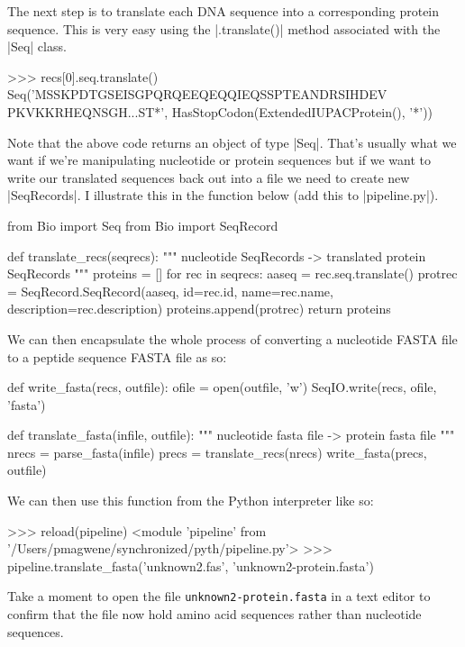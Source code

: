 The next step is to translate each  DNA sequence into a corresponding protein sequence. This is very easy using the |.translate()| method associated with the |Seq| class.

\begin{python}
>>> recs[0].seq.translate()
Seq('MSSKPDTGSEISGPQRQEEQEQQIEQSSPTEANDRSIHDEV
PKVKKRHEQNSGH...ST*', HasStopCodon(ExtendedIUPACProtein(), '*'))
\end{python}
%
Note that the above code returns an object of type |Seq|. That's usually what we want if we're manipulating nucleotide or protein sequences but if we want to write our translated sequences back out into a file we need to create new |SeqRecords|. I illustrate this in the function below (add this to |pipeline.py|).

\begin{python}
from Bio import Seq
from Bio import SeqRecord

def translate_recs(seqrecs):
    """ nucleotide SeqRecords -> translated protein SeqRecords """ 
    proteins = []
    for rec in seqrecs:
        aaseq = rec.seq.translate()
        protrec = SeqRecord.SeqRecord(aaseq, id=rec.id, name=rec.name, 
        			      description=rec.description)
        proteins.append(protrec)
    return proteins
\end{python}    

We can then encapsulate the whole process of converting a nucleotide FASTA file to a peptide sequence FASTA file as so:

\begin{python}
def write_fasta(recs, outfile):
    ofile = open(outfile, 'w')
    SeqIO.write(recs, ofile, 'fasta')

def translate_fasta(infile, outfile):
    """ nucleotide fasta file -> protein fasta file """
    nrecs = parse_fasta(infile)
    precs = translate_recs(nrecs)
    write_fasta(precs, outfile)
\end{python}

We can then use this function from the Python interpreter like so:

\begin{python}
>>> reload(pipeline)
<module 'pipeline' from '/Users/pmagwene/synchronized/pyth/pipeline.py'>
>>> pipeline.translate_fasta('unknown2.fas', 'unknown2-protein.fasta')
\end{python}
%
Take a moment to open the file \texttt{unknown2-protein.fasta} in a text editor to confirm that the file now hold amino acid sequences rather than nucleotide sequences.


